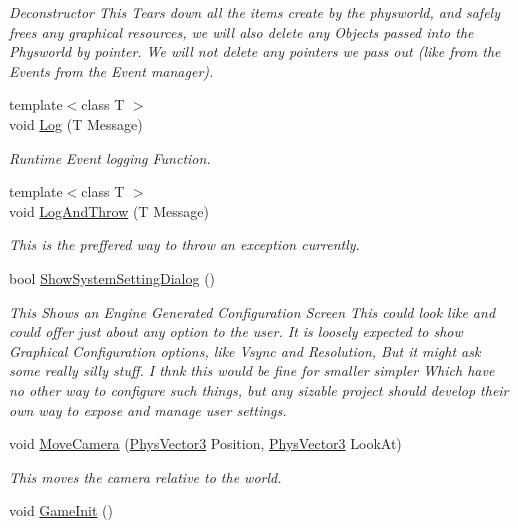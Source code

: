 \begin{DoxyCompactItemize}
\begin{DoxyCompactList}\small\item\em Deconstructor This Tears down all the items create by the physworld, and safely frees any graphical resources, we will also delete any Objects passed into the Physworld by pointer. We will not delete any pointers we pass out (like from the Events from the Event manager). \item\end{DoxyCompactList}\item 
{\footnotesize template$<$class T $>$ }\\void \hyperlink{classPhysWorld_a5e9fead1c3100f5dbd5ca985b82b85ea}{Log} (T Message)
\begin{DoxyCompactList}\small\item\em Runtime Event logging Function. \item\end{DoxyCompactList}\item 
{\footnotesize template$<$class T $>$ }\\void \hyperlink{classPhysWorld_a1c2aeaed2a89821a4545db854da33ab8}{LogAndThrow} (T Message)
\begin{DoxyCompactList}\small\item\em This is the preffered way to throw an exception currently. \item\end{DoxyCompactList}\item 
\hypertarget{classPhysWorld_a9b83f04907443c6307956a3c4089e3ca}{
bool \hyperlink{classPhysWorld_a9b83f04907443c6307956a3c4089e3ca}{ShowSystemSettingDialog} ()}
\label{db/df5/classPhysWorld_a9b83f04907443c6307956a3c4089e3ca}

\begin{DoxyCompactList}\small\item\em This Shows an Engine Generated Configuration Screen This could look like and could offer just about any option to the user. It is loosely expected to show Graphical Configuration options, like Vsync and Resolution, But it might ask some really silly stuff. I thnk this would be fine for smaller simpler Which have no other way to configure such things, but any sizable project should develop their own way to expose and manage user settings. \item\end{DoxyCompactList}\item 
void \hyperlink{classPhysWorld_a1df24ee06d5881825902b60e0d81174a}{MoveCamera} (\hyperlink{classPhysVector3}{PhysVector3} Position, \hyperlink{classPhysVector3}{PhysVector3} LookAt)
\begin{DoxyCompactList}\small\item\em This moves the camera relative to the world. \item\end{DoxyCompactList}\item 
\hypertarget{classPhysWorld_a6d65a7412c1711497fbd1173f879243a}{
void \hyperlink{classPhysWorld_a6d65a7412c1711497fbd1173f879243a}{GameInit} ()}
\label{db/df5/classPhysWorld_a6d65a7412c1711497fbd1173f879243a}


\end{DoxyCompactItemize}
